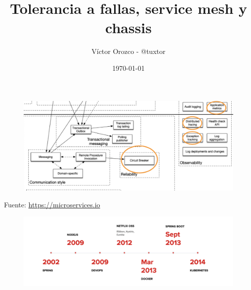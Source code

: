 \documentclass[aspectratio=169]{beamer}
\title{Tolerancia a fallas, service mesh y chassis}
\author{Víctor Orozco - @tuxtor}
\institute{Nabenik}
\date{\today}
\begin{document}
{
    \frame{\titlepage}
}



\begin{frame}{}
    \begin{figure}
        \centering
        \includegraphics[width=\linewidth]{Images/patterns.png}
    \end{figure}
    Fuente: \url{https://microservices.io}
\end{frame}

\begin{frame}{}
    \begin{figure}
        \centering
        \includegraphics[width=\linewidth]{Images/evolucioncloudnative.png}
    \end{figure}
\end{frame}
\end{document}
